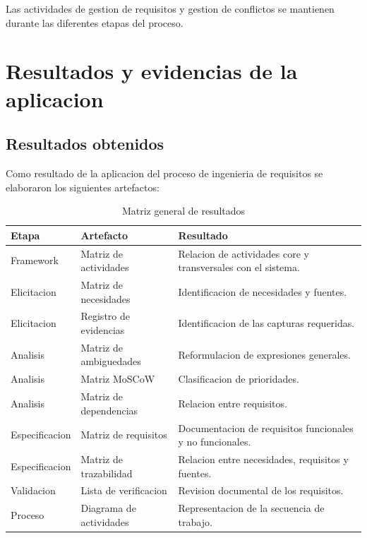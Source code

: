 \documentclass[11pt,a4paper]{article}
\begin{document}
Las actividades de gestion de requisitos y
gestion de conflictos se mantienen durante
las diferentes etapas del proceso.

\section{Resultados y evidencias de la aplicacion}

\subsection{Resultados obtenidos}

Como resultado de la aplicacion del proceso
de ingenieria de requisitos se elaboraron
los siguientes artefactos:

\begin{table}[H]
\centering
\caption{Matriz general de resultados}
\small
\begin{tabularx}{\textwidth}{p{3cm}YY}
\toprule
\textbf{Etapa} &
\textbf{Artefacto} &
\textbf{Resultado} \\
\midrule

Framework &
Matriz de actividades &
Relacion de actividades core y transversales
con el sistema. \\

Elicitacion &
Matriz de necesidades &
Identificacion de necesidades y fuentes. \\

Elicitacion &
Registro de evidencias &
Identificacion de las capturas requeridas. \\

Analisis &
Matriz de ambiguedades &
Reformulacion de expresiones generales. \\

Analisis &
Matriz MoSCoW &
Clasificacion de prioridades. \\

Analisis &
Matriz de dependencias &
Relacion entre requisitos. \\

Especificacion &
Matriz de requisitos &
Documentacion de requisitos funcionales
y no funcionales. \\

Especificacion &
Matriz de trazabilidad &
Relacion entre necesidades, requisitos y fuentes. \\

Validacion &
Lista de verificacion &
Revision documental de los requisitos. \\

Proceso &
Diagrama de actividades &
Representacion de la secuencia de trabajo. \\

\bottomrule
\end{tabularx}
\end{table}
\end{document}
